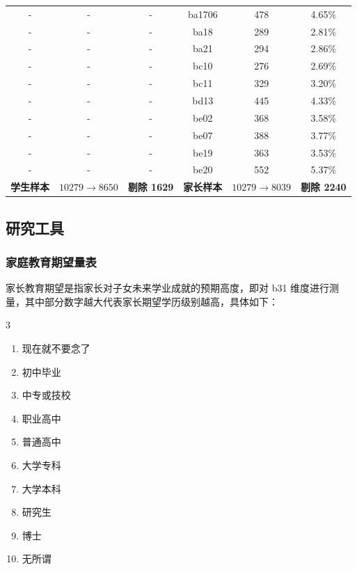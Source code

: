 \documentclass[zihao = -4, linespread = 1.5]{article}
\begin{document}
\begin{table}[!t]
\begin{tabular}{ccc|ccc}
        -     & -   & -      & ba1706 & 478 & 4.65\% \\
        -     & -   & -      & ba18   & 289 & 2.81\% \\
        -     & -   & -      & ba21   & 294 & 2.86\% \\
        -     & -   & -      & bc10   & 276 & 2.69\% \\
        -     & -   & -      & bc11   & 329 & 3.20\% \\
        -     & -   & -      & bd13   & 445 & 4.33\% \\
        -     & -   & -      & be02   & 368 & 3.58\% \\
        -     & -   & -      & be07   & 388 & 3.77\% \\
        -     & -   & -      & be19   & 363 & 3.53\% \\
        -     & -   & -      & be20   & 552 & 5.37\% \\
        \hline
        \textbf{学生样本} & $10279\rightarrow8650$ & \textbf{剔除 1629} & \textbf{家长样本} & $10279\rightarrow8039$ & \textbf{剔除 2240} \\
        \toprule[1.5pt]
    \end{tabular}
\end{table}



\subsection{研究工具}
\subsubsection{家庭教育期望量表}
家长教育期望是指家长对子女未来学业成就的预期高度，即对 b31 维度进行测量，其中部分数字越大代表家长期望学历级别越高，具体如下：

\begin{center}
    \begin{minipage}{0.9\textwidth}
        \setlength{\columnsep}{2em}
        \setlength{\columnseprule}{0.5pt}
        \begin{multicols}{3}
            \begin{enumerate}
                \item 现在就不要念了
                \item 初中毕业
                \item 中专或技校
                \item 职业高中
                \item 普通高中
                \item 大学专科
                \item 大学本科
                \item 研究生
                \item 博士
                \item 无所谓
            \end{enumerate}
        \end{multicols}
    \end{minipage}
\end{center}
\end{document}

